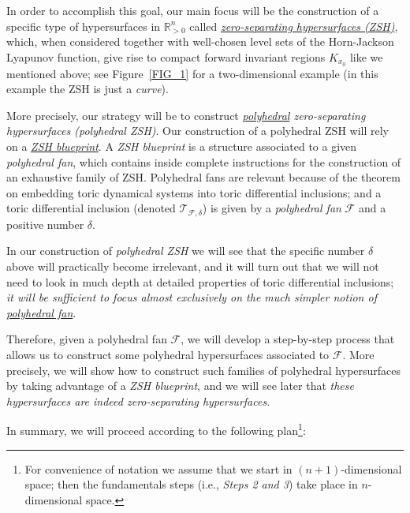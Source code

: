 \documentclass[12pt,letterpaper]{article}
\newcommand{\T}{\mathcal{T}}
\newcommand{\F}{\mathcal{F}}
\newcommand{\RRp}{\mathbb{R}_{>0}}
\newcommand{\RRpn}{\mathbb{R}_{>0}^n}
\begin{document}
In order to accomplish this goal, our main focus will be the construction of a specific type of hypersurfaces in $\RRp^n$ called \underline{\em zero-separating hypersurfaces (ZSH)}, which, when considered together with well-chosen level sets of the Horn-Jackson Lyapunov function, give rise to compact forward invariant regions $K_{x_0}$ like we mentioned above; see Figure~\ref{FIG_1} for a two-dimensional example (in this example the ZSH is just a {\em curve}). 

More precisely, our strategy will be to construct {\em \underline{polyhedral} zero-separating hypersurfaces (polyhedral ZSH)}. 
Our construction of a polyhedral ZSH will rely on a \underline{{\em ZSH blueprint}}. A {\em ZSH blueprint} is a structure associated to a given {\em polyhedral fan}, which contains inside complete instructions for the construction of an exhaustive family of ZSH. Polyhedral fans are relevant because of the theorem on embedding toric dynamical systems into toric differential inclusions; and a toric differential inclusion (denoted $\T_{\F, \delta}$) is given by a {\em polyhedral fan} $\mathcal{F}$ and a positive number $\delta$. 

In our construction of {\em polyhedral ZSH} we will see that the specific number $\delta$ above will practically become irrelevant, and it will turn out that we will not need to look in much depth at  detailed properties of toric differential inclusions; {\em it will be sufficient to focus almost exclusively on the much simpler notion of \ul{polyhedral fan}}. 

\medskip

Therefore, given a polyhedral fan $\F$, we will develop a step-by-step process that allows us to construct some polyhedral  hypersurfaces associated to $\F$. More precisely, we will show how to construct such families of polyhedral hypersurfaces by taking advantage of a {\em ZSH blueprint}, and we will see later that {\em these hypersurfaces are indeed zero-separating hypersurfaces}. 

\bigskip

\noindent
In summary, we will proceed according to the following plan\footnote{For convenience of notation we assume that we start in $(n+1)$-dimensional space; then the fundamentals steps (i.e., {\em Steps 2 and 3}) take place in $n$-dimensional space.}:
\end{document}
